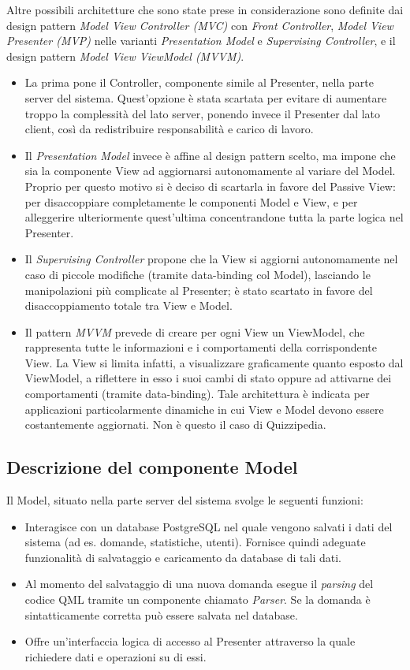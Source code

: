 \documentclass[a4paper,11pt]{article}
\begin{document}
	Altre possibili architetture che sono state prese in considerazione sono definite dai design pattern \emph{Model View Controller (MVC)} con \emph{Front Controller}, \emph{Model View Presenter (MVP)} nelle varianti \emph{Presentation Model} e \emph{Supervising Controller}, e il design pattern \emph{Model View ViewModel (MVVM)}.
	\begin{itemize}
	\item La prima pone il Controller, componente simile al Presenter, nella parte server del sistema. Quest'opzione è stata scartata per evitare di aumentare troppo la complessità del lato server, ponendo invece il Presenter dal lato client, così da redistribuire responsabilità e carico di lavoro.
	\item Il \emph{Presentation Model} invece è affine al design pattern scelto, ma impone che sia la componente View ad aggiornarsi autonomamente al variare del Model. Proprio per questo motivo si è deciso di scartarla in favore del Passive View: per disaccoppiare completamente le componenti Model e View, e per alleggerire ulteriormente quest'ultima concentrandone tutta la parte logica nel Presenter.
	\item Il \emph{Supervising Controller} propone che la View si aggiorni autonomamente nel caso di piccole modifiche (tramite data-binding col Model), lasciando le manipolazioni più complicate al Presenter; è stato scartato in favore del disaccoppiamento totale tra View e Model.
	\item Il pattern \emph{MVVM} prevede di creare per ogni View un ViewModel, che rappresenta tutte le informazioni e i comportamenti della corrispondente View. La View si limita infatti, a visualizzare graficamente quanto esposto dal ViewModel, a riflettere in esso i suoi cambi di stato oppure ad attivarne dei comportamenti (tramite data-binding). Tale architettura è indicata per applicazioni particolarmente dinamiche in cui View e Model devono essere costantemente aggiornati. Non è questo il caso di Quizzipedia.
	\end{itemize}
	\subsection{Descrizione del componente Model}
	Il Model, situato nella parte server del sistema svolge le seguenti funzioni:
	\begin{itemize}
		\item Interagisce con un database PostgreSQL nel quale vengono salvati i dati del sistema (ad es. domande, statistiche, utenti). Fornisce quindi adeguate funzionalità di salvataggio e caricamento da database di tali dati.
		\item Al momento del salvataggio di una nuova domanda esegue il \emph{parsing} del codice QML tramite un componente chiamato \emph{Parser}. Se la domanda è sintatticamente corretta può essere salvata nel database.
		\item Offre un'interfaccia logica di accesso al Presenter attraverso la quale richiedere dati e operazioni su di essi.
	\end{itemize}
\end{document}
